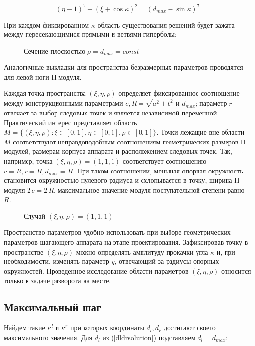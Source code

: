 \begin{equation}
(\eta-1)^2-(\xi+\cos{\kappa})^2 = (d_{max}-\sin{\kappa})^2
\end{equation}

 При каждом фиксированном $\kappa$ область существования решений будет зажата между пересекающимися прямыми и ветвями гиперболы:

\begin{figure}
\caption{Сечение плоскостью $\rho=d_{max} = const$}
\end{figure}

Аналогичные выкладки для пространства безразмерных параметров проводятся для левой ноги Н-модуля.

Каждая точка пространства $(\xi,\eta,\rho)$ определяет фиксированное соотношение между конструкционными параметрами $c, R = \sqrt{a^2+b^2}$ и $d_{max}$; параметр $r$ отвечает за выбор следовых точек и является независимой переменной. Практический интерес представляет область $M = \{(\xi,\eta,\rho):\xi \in [0,1], \eta \in [0,1], \rho \in[0,1]\}$. Точки лежащие вне области $M$ соответствуют неправдоподобным соотношениям геометрических размеров Н-модулей, размерам корпуса аппарата и расположением следовых точек. Так, например, точка $(\xi,\eta,\rho) = (1,1,1)$ соответствует соотношению $c = R, r = R, d_{max} = R$. При таком соотношении, меньшая опорная окружность становится окружностью нулевого радиуса и схлопывается в точку, ширина Н-модуля $2\,c = 2\,R$, максимальное значение модуля поступательной степени равно $R$. 

\begin{figure}
\caption{Случай $(\xi,\eta,\rho) = (1,1,1)$}
\end{figure}


Пространство параметров удобно использовать при выборе геометрических параметров шагающего аппарата на этапе проектирования. Зафиксировав точку в пространстве $(\xi,\eta,\rho)$ можно определять амплитуду прокачки угла $\kappa$ и, при необходимости, изменять параметр $\eta$, отвечающий за радиусы опорных окружностей. Проведенное исследование области параметров $(\xi,\eta,\rho)$ относится только к задаче разворота на месте.


\subsection{Максимальный шаг}
Найдем такие $\kappa^l$ и $\kappa^{r}$ при которых координаты $d_l, d_r$ достигают своего максимального значения. Для $d_l$ из (\ref{dldrsolution}) подставляем $d_l=d_{max}$:

